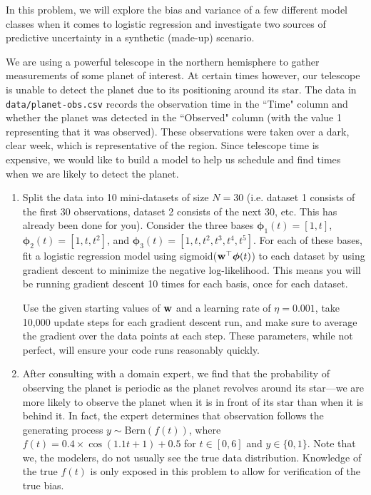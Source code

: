 \documentclass[submit]{harvardml}
\begin{document}
\begin{problem}
In this problem, we will explore the bias and variance of a few
different model classes when it comes to logistic regression and
investigate two sources of predictive uncertainty in a synthetic
(made-up) scenario.

We are using a powerful telescope in the northern hemisphere to gather
measurements of some planet of interest. At certain times however, our
telescope is unable to detect the planet due to its positioning around
its star.  The data in \verb|data/planet-obs.csv| records the
observation time in the ``Time" column and whether the planet was
detected in the ``Observed" column (with the value 1 representing that
it was observed).  These observations were taken over a dark, clear
week, which is representative of the region.  Since telescope time is
expensive, we would like to build a model to help us schedule and find
times when we are likely to detect the planet.

\begin{enumerate}
\item Split the data into 10 mini-datasets of size $N = 30$ (i.e. dataset 1 consists of the first 30 observations, dataset 2 consists of the next 30, etc. This has already been done for you). Consider the three bases $\boldsymbol\phi_1(t) = [1, t]$, $\boldsymbol\phi_2(t) = [1,
  t, t^2]$, and $\boldsymbol\phi_3(t) = [1, t, t^2, t^3, t^4, t^5]$. For each of these bases, fit a logistic regression model using sigmoid($\mathbf{w}^\top \boldsymbol\phi(t)$) to each dataset by using gradient descent to
  minimize the negative log-likelihood.  This means you will be
  running gradient descent 10 times for each basis, once for each
  dataset.
  
  Use the given starting values of $\mathbf{w}$ and a learning rate of $\eta=0.001$, take 10,000 update
  steps for each gradient descent run, and make sure to average the
  gradient over the data points at each step. These parameters,
  while not perfect, will ensure your code runs reasonably quickly. 

\item After consulting with a domain expert, we find that the probability of observing the planet is periodic as the planet revolves around its star---we are more likely to observe the planet when it is in front of its star than when it is behind it. In fact, the expert determines that observation follows the generating process $y \sim \text{Bern}(f(t))$, where $f(t) = 0.4 \times \cos(1.1t + 1) + 0.5$ for $t \in [0, 6]$ and $y \in \{0,1\}$. Note that we, the modelers, do not usually see the true data distribution. Knowledge of the true $f(t)$ is only exposed in this problem to allow for verification of the true bias.


\end{enumerate}
\end{problem}
\end{document}
